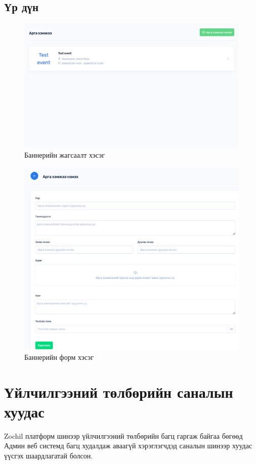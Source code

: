\subsection{Үр дүн}
\begin{figure}[h]
	\centering
	\includegraphics[scale=0.2]{src/images/event-list.png}
	\caption{Баннерийн жагсаалт хэсэг}
\end{figure}
\begin{figure}[h]
	\centering
	\includegraphics[scale=0.2]{src/images/event-form.png}
	\caption{Баннерийн форм хэсэг}
\end{figure}

\clearpage\section{Үйлчилгээний төлбөрийн саналын хуудас}
Zochil платформ шинээр үйлчилгээний төлбөрийн багц гаргаж байгаа бөгөөд Админ веб системд багц худалдаж аваагүй хэрэглэгчдэд саналын шинээр хуудас үүсгэх шаардлагатай болсон.


